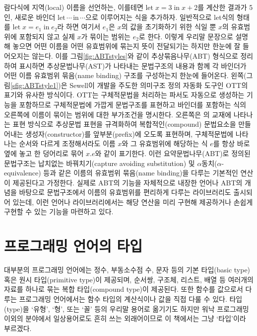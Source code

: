 람다식에 지역(local) 이름을 선언하는, 이를테면
$\textrm{let}\;x=3\;\textrm{in}\;x+2$를 계산한 결과가 5인,
새로운 바인더 $\textrm{let}\,\cdots\,\textrm{in}\,\cdots$으로
이루어지는 식을 추가하자.
일반적으로 let식의 형태를 $\textrm{let}\;x=e_1\;\textrm{in}\;e_2$라
하면 여기서 $e_1$은 $x$의 값을 초기화하기 위한 식일 뿐
$x$의 유효범위에 포함되지 않고 실제 $x$가 묶이는 범위는 $e_2$로 한다.
이렇게 우리말 문장으로 설명해 놓으면 어떤 이름을 어떤 유효범위에
묶는지 뜻이 전달되기는 하지만 한눈에 잘 들어오지는 않는다.
이를 그림\;\ref{fig:ABTstyles}와 같이 추상묶음나무(ABT) 형식으로 정리하여
표시하면 추상문법나무(AST)가 나타내는 문법구조의 내용과 함께
각 바인더가 어떤 이름 유효범위 묶음(name binding) 구조를 구성하는지
한눈에 들어온다. 왼쪽(그림\;\ref{sfig:ABTstyle1})은
Sewell\cite{Sewell2007ott}이 개발을 주도한 의미구조 정의
자동화 도구인 OTT의 표기와 유사한 방식이다.
OTT는 구체적문법을 처리하는 파서도 자동으로 생성하는 기능을
포함하므로 구체적문법에 가깝게 문법구조를 표현하고
바인더를 포함하는 식의 오른쪽에 이름이 묶이는 범위에
대한 부가조건을 명시한다. 오른쪽은 \citet{PFPL2nd}의 교재에 나타나는
표현 방식으로 추상문법 표현을 규격화하여 복합적인(compound) 문법요소을
만들어내는 생성자(constructor)를 앞부분(prefix)에 오도록 표현하며,
구체적문법에 나타나는 순서와 다르게 조정해서라도 이름 $x$와 그 유효범위에
해당하는 식 $e$를 항상 바로 옆에 놓고 한 덩어리로 묶어 $x.e$와
같이 표기한다. 이런 요약문법나무(ABT)로 정의된 문법구조는
납치없는 바꿔치기(capture avoiding substitution) 및
$\alpha$동치($\alpha$-equivalence) 등과 같은
이름의 유효범위 묶음(name binding)을 다루는 기본적인 연산이
제공된다고 가정한다. 실제로 ABT의 기능을 자체적으로 내장한
언어\cite{FreshML2003}나 ABT의 개념을 바탕으로 문법구조에서
이름의 유효범위를 편리하게 다루는 라이브러리\cite{Unbound2011}도
출시되어 있는데, 이런 언어나 라이브러리에서는 해당 연산을
미리 구현해 제공하거나 손쉽게 구현할 수 있는 기능을 마련하고 있다.

\section{프로그래밍 언어의 타입}
대부분의 프로그래밍 언어에는 정수, 부동소수점 수, 문자 등의
기본 타입(basic type) 혹은 원시 타입(primitive type)이 제공되며,
순서쌍, 구조체, 리스트, 배열 등 여러개의 자료를 하나로 묶는
복합 타입(compound type)이 제공된다. 또한 함수를 값으로서 다루는
프로그래밍 언어에서는 함수 타입의 계산식이나 값을 직접 다룰 수 있다.
타입(type)을 `유형', `형', 또는 `꼴' 등의 우리말 용어로 옮기기도
하지만 워낙 프로그래밍 이외의 분야에서 일상용어로도 흔히 쓰는
외래어이므로 이 책에서는 그냥 `타입'이라 부르겠다.

